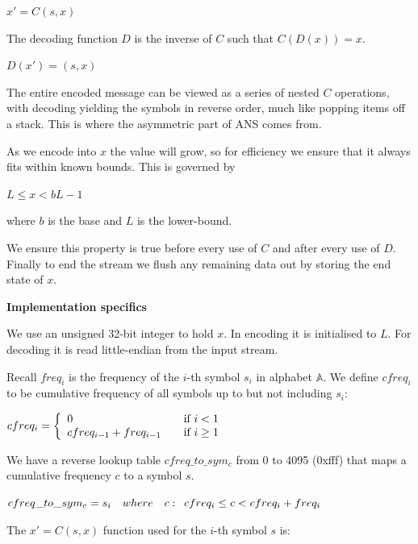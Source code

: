 \documentclass[a4paper]{article}
\begin{document}
{
\setlength{\parindent}{1cm}
\indent $x' = C(s,x)$
}

The decoding function $D$ is the inverse of $C$ such that $C(D(x)) = x$.

{
\setlength{\parindent}{1cm}
\indent $D(x') = (s,x)$
}

The entire encoded message can be viewed as a series of nested $C$
operations, with decoding yielding the symbols in reverse order, much
like popping items off a stack.  This is where the asymmetric part of
ANS comes from.

As we encode into $x$ the value will grow, so for efficiency we ensure
that it always fits within known bounds. This is governed by

{
\setlength{\parindent}{1cm}
\indent $L \leq x < bL-1$
}


where $b$ is the base and $L$ is the lower-bound.

We ensure this property is true before every use of $C$ and after every
use of $D$.  Finally to end the stream we flush any remaining data out
by storing the end state of $x$.


\textbf{Implementation specifics}

We use an unsigned 32-bit integer to hold $x$. In encoding it is
initialised to $L$. For decoding it is read little-endian from the
input stream.

Recall $freq_{i}$ is the frequency of the $i$-th symbol $s_{i}$ in alphabet
$\mathbb{A}$.  We define $cfreq_i$ to be cumulative frequency of all symbols
up to but not including $s_{i}$:

{
\setlength{\parindent}{1cm}
$ cfreq_{i} = \left\{
\begin{array}{l l}
0 & \quad \textrm{if $i < 1$} \\
cfreq_{i-1} + freq_{i-1} & \quad \textrm{if $i \geq 1$}
\end{array}
\right. $
}


We have a reverse lookup table $cfreq\_to\_sym_c$ from 0 to 4095
(0xfff) that maps a cumulative frequency $c$ to a symbol $s$.

{
\setlength{\parindent}{1cm}
\indent   $cfreq\_to\_sym_c = s_{i} \quad where \quad c: \enskip cfreq_i \leq c <
cfreq_i + freq_i$
}


The $x' = C(s,x)$ function used for the $i$-th symbol $s$ is:
\end{document}
